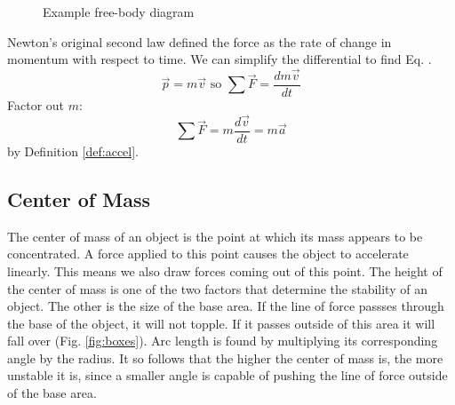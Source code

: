 \begin{figure}[ht]
	\centering
	\caption{Example free-body diagram}
	\label{fig:example}
\end{figure}

Newton's original second law defined the force as the rate of change in momentum with respect to time. We can simplify the differential to find Eq. \label{eq:newton}.
\[\vec{p}=m\vec{v} \text{ so } \sum\vec{F}=\frac{dm\vec{v}}{dt}\]
Factor out $m$:
\[\sum\vec{F}=m\frac{d\vec{v}}{dt} = m\vec{a}\]
by Definition \ref{def:accel}.

\subsection{Center of Mass}

The center of mass of an object is the point at which its mass appears to be concentrated. A force applied to this point causes the object to accelerate linearly. This means we also draw forces coming out of this point. The height of the center of mass is one of the two factors that determine the stability of an object. The other is the size of the base area. If the line of force passses through the base of the object, it will not topple. If it passes outside of this area it will fall over (Fig. \ref{fig:boxes}). Arc length is found by multiplying its corresponding angle by the radius. It so follows that the higher the center of mass is, the more unstable it is, since a smaller angle is capable of pushing the line of force outside of the base area.

